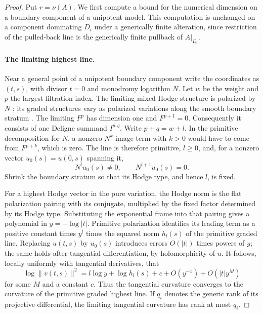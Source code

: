 \begin{proof}
Put $r=\nu(A)$.  We first compute a bound for the numerical
dimension on a boundary component of a unipotent model.  This
computation is unchanged on a component dominating $D_i$ under a
generically finite alteration, since restriction of the pulled-back
line is the generically finite pullback of $A|_{D_i}$.

\paragraph{The limiting highest line.}
Near a general point of a unipotent boundary component write the
coordinates as $(t,s)$, with divisor $t=0$ and monodromy logarithm
$N$.  Let $w$ be the weight and $p$ the largest filtration index.
The limiting mixed Hodge structure is polarized by $N$
\cite[Theorem~6.16]{Schmid}; its graded structures vary as polarized
variations along the smooth boundary stratum
\cite[Proposition~2.10 and the following discussion]{CattaniKaplanDegenerating}.
The limiting $F^p$ has dimension one and $F^{p+1}=0$.  Consequently
it consists of one Deligne summand $I^{p,q}$.  Write
$p+q=w+l$.  In the primitive decomposition for $N$, a nonzero
$N^k$-image term with $k>0$ would have to come from $F^{p+k}$,
which is zero.  The line is therefore primitive, $l\geq0$, and,
for a nonzero vector $u_0(s)=u(0,s)$ spanning it,
\[
       N^lu_0(s)\ne0,\qquad N^{l+1}u_0(s)=0.
\]
Shrink the boundary stratum so that its Hodge type, and hence $l$,
is fixed.

For a highest Hodge vector in the pure variation, the Hodge norm is
the flat polarization pairing with its conjugate, multiplied by the
fixed factor determined by its Hodge type.
Substituting the exponential frame into that pairing gives a
polynomial in $y=-\log|t|$.  Primitive polarization identifies its
leading term as a positive constant times $y^l$ times the squared
norm $h_l(s)$ of the primitive graded line.  Replacing $u(t,s)$
by $u_0(s)$ introduces errors $O(|t|)$ times powers of $y$;
the same holds after tangential differentiation, by holomorphicity
of $u$.  It follows, locally uniformly with tangential derivatives,
that
\begin{equation}\label{p1varhd:limitnorm}
 \log\|v(t,s)\|^2
      =l\log y+\log h_l(s)+c+O(y^{-1})+O(|t|y^M)
\end{equation}
for some $M$ and a constant $c$.  Thus the tangential curvature
converges to the curvature of the primitive graded highest line.
If $q_i$ denotes the generic rank of its projective differential,
the limiting tangential curvature has rank at most $q_i$.


\end{proof}
